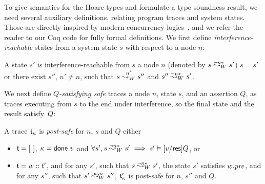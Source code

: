 
To give semantics for the Hoare types and formulate a type soundness
result, we need several auxiliary definitions, relating program traces
and system states.
%
Those are directly inspired by modern concurrency
logics~\cite{LeyWild-Nanevski:POPL13,Nanevski-al:ESOP14}, and we refer
the reader to our Coq code for fully formal definitions.
%
We first define \emph{interference-reachable} states from a system
state $s$ with respect to a node $n$:
%
\begin{definition}
\label{def:irs}
A state $s'$ is interference-reachable from $s$ \wrt a node $n$
(denoted by $\ninf{W}{n}{s}{s'}$) \Iff $s = s'$ or there exist $s''$,
$n' \neq n$, such that $\nsem{W}{n'}{s}{s''}$ and
$\ninf{W}{n}{s''}{s'}$.
\end{definition}
%
\noindent
%
We next define \emph{$Q$-satisfying safe} traces \wrt a node $n$,
state $s$, and an assertion $Q$, as traces executing from $s$ to the end
under interference, so the final state and the result satisfy~$Q$:
%
%
%
\begin{definition}
\label{def:safe}
A trace $\trace_{\stat}$ is \emph{post-safe} for $n$, $s$ and $Q$ \Iff either

\begin{itemize}
\item $\trace = [~]$, $\stat = \done~v$ and  $\forall s',
  \ninf{W}{n}{s}{s'} \implies s' \vDash [v/\res]Q$, or

\item $\trace = w :: \trace'$, and for any $s'$, such that $\ninf{W}{n}{s}{s'}$,
  the state $s'$ satisfies $w.\prei$, and for any $s''$, such that
  $\nsemw{W}{n}{s'}{s''}$, $\trace'_{\stat}$ is post-safe for $n$,
  $s''$ and $Q$.
\end{itemize}
\end{definition}
%

